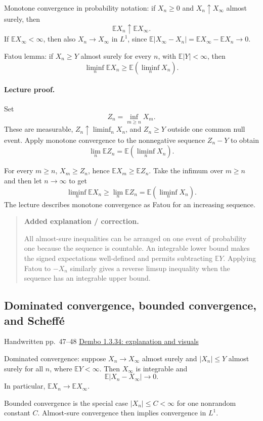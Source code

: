 \documentclass[11pt,letterpaper]{article}
\newcommand{\lecturesection}[1]{\subsection{#1}}
\begin{document}
Monotone convergence in probability notation: if $X_n\ge0$ and $X_n\uparrow X_\infty$ almost surely, then \[\mathbb E X_n\uparrow\mathbb E X_\infty.\] If $\mathbb E X_\infty<\infty$, then also $X_n\to X_\infty$ in $L^1$, since $\mathbb E|X_\infty-X_n|=\mathbb E X_\infty-\mathbb E X_n\to0$.

Fatou lemma: if $X_n\ge Y$ almost surely for every $n$, with $\mathbb E|Y|<\infty$, then \[\liminf_n\mathbb E X_n\ge\mathbb E(\liminf_n X_n).\]

\paragraph{Lecture proof.}
Set \[Z_n=\inf_{m\ge n}X_m.\] These are measurable, $Z_n\uparrow\liminf_nX_n$, and $Z_n\ge Y$ outside one common null event. Apply monotone convergence to the nonnegative sequence $Z_n-Y$ to obtain \[\lim_n\mathbb E Z_n=\mathbb E(\liminf_nX_n).\]

For every $m\ge n$, $X_m\ge Z_n$, hence $\mathbb E X_m\ge\mathbb E Z_n$. Take the infimum over $m\ge n$ and then let $n\to\infty$ to get \[\liminf_n\mathbb E X_n\ge\lim_n\mathbb E Z_n=\mathbb E(\liminf_nX_n).\] The lecture describes monotone convergence as Fatou for an increasing sequence.

\begin{quote}\small\textbf{Added explanation / correction.}

All almost-sure inequalities can be arranged on one event of probability one because the sequence is countable. An integrable lower bound makes the signed expectations well-defined and permits subtracting $\mathbb E Y$. Applying Fatou to $-X_n$ similarly gives a reverse limsup inequality when the sequence has an integrable upper bound.
\end{quote}

\hypertarget{l6-s3}{}
\lecturesection{Dominated convergence, bounded convergence, and Scheffé}
{\small\textcolor{lectureink}{Handwritten pp.\ 47--48} \quad \href{https://josephrbailey.com/probability/\#entry-1-3-34}{Dembo 1.3.34: explanation and visuals}}

Dominated convergence: suppose $X_n\to X_\infty$ almost surely and $|X_n|\le Y$ almost surely for all $n$, where $\mathbb E Y<\infty$. Then $X_\infty$ is integrable and \[\mathbb E|X_n-X_\infty|\longrightarrow0.\] In particular, $\mathbb E X_n\to\mathbb E X_\infty$.

Bounded convergence is the special case $|X_n|\le C<\infty$ for one nonrandom constant $C$. Almost-sure convergence then implies convergence in $L^1$.
\end{document}
